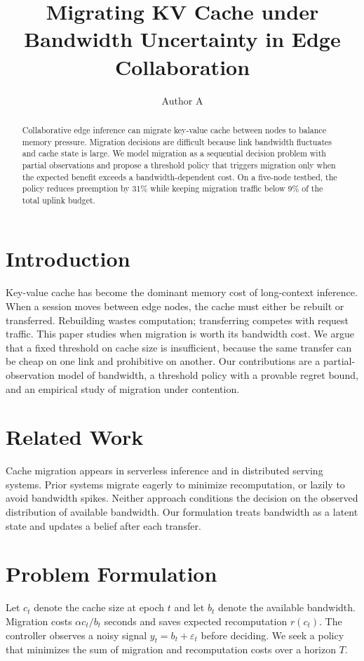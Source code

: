 \documentclass[conference]{IEEEtran}
\title{Migrating KV Cache under Bandwidth Uncertainty in Edge Collaboration}
\author{Author A}
\begin{document}
\maketitle

\begin{abstract}
Collaborative edge inference can migrate key-value cache between nodes to balance memory pressure.
Migration decisions are difficult because link bandwidth fluctuates and cache state is large.
We model migration as a sequential decision problem with partial observations and propose a threshold policy that triggers migration only when the expected benefit exceeds a bandwidth-dependent cost.
On a five-node testbed, the policy reduces preemption by 31\% while keeping migration traffic below 9\% of the total uplink budget.
\end{abstract}

\section{Introduction}
\label{sec:intro}
Key-value cache has become the dominant memory cost of long-context inference.
When a session moves between edge nodes, the cache must either be rebuilt or transferred.
Rebuilding wastes computation; transferring competes with request traffic.
This paper studies when migration is worth its bandwidth cost.
We argue that a fixed threshold on cache size is insufficient, because the same transfer can be cheap on one link and prohibitive on another.
Our contributions are a partial-observation model of bandwidth, a threshold policy with a provable regret bound, and an empirical study of migration under contention.

\section{Related Work}
\label{sec:related}
Cache migration appears in serverless inference and in distributed serving systems.
Prior systems migrate eagerly to minimize recomputation, or lazily to avoid bandwidth spikes.
Neither approach conditions the decision on the observed distribution of available bandwidth.
Our formulation treats bandwidth as a latent state and updates a belief after each transfer.

\section{Problem Formulation}
\label{sec:problem}
Let $c_t$ denote the cache size at epoch $t$ and let $b_t$ denote the available bandwidth.
Migration costs $\alpha c_t / b_t$ seconds and saves expected recomputation $r(c_t)$.
The controller observes a noisy signal $y_t = b_t + \varepsilon_t$ before deciding.
We seek a policy that minimizes the sum of migration and recomputation costs over a horizon $T$.
\end{document}
